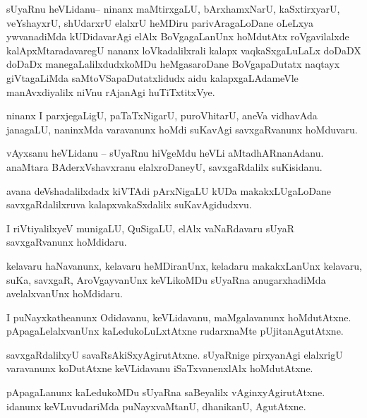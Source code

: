 \documentclass{article}
\begin{document}
\begin{mng}%
sUyaRnu heVLidanu-- ninanx maMtirxgaLU, bArxhamxNarU, kaSxtirxyarU, veYshayxrU, shUdarxrU elalxrU 
heMDiru parivAragaLoDane oLeLxya ywvanadiMda kUDidavarAgi elAlx BoVgagaLanUnx hoMdutAtx 
roVgavilalxde kalApxMtaradavaregU nananx loVkadalilxrali kalapx vaqkaSxgaLuLaLx doDaDX doDaDx 
manegaLalilxdudxkoMDu heMgasaroDane BoVgapaDutatx naqtayx giVtagaLiMda saMtoVSapaDutatxlidudx 
aidu kalapxgaLAdameVle manAvxdiyalilx niVnu rAjanAgi huTiTxtitxVye.
\end{mng}

\begin{mng}%
ninanx I parxjegaLigU, paTaTxNigarU, puroVhitarU, aneVa vidhavAda janagaLU, naninxMda varavanunx 
hoMdi suKavAgi savxgaRvanunx hoMduvaru.
\end{mng}

\begin{mng}%
vAyxsanu heVLidanu -- sUyaRnu hiVgeMdu heVLi aMtadhARnanAdanu. anaMtara BAderxVshavxranu 
elalxroDaneyU, savxgaRdalilx suKisidanu.
\end{mng}

\begin{mng}%
avana deVshadalilxdadx kiVTAdi pArxNigaLU kUDa makakxLUgaLoDane savxgaRdalilxruva 
kalapxvakaSxdalilx suKavAgidudxvu.
\end{mng}

\begin{mng}%
I riVtiyalilxyeV munigaLU, QuSigaLU, elAlx vaNaRdavaru sUyaR savxgaRvanunx hoMdidaru.
\end{mng}

\begin{mng}%
kelavaru haNavanunx, kelavaru heMDiranUnx, keladaru makakxLanUnx kelavaru, suKa, savxgaR, 
AroVgayvanUnx keVLikoMDu sUyaRna anugarxhadiMda avelalxvanUnx hoMdidaru.
\end{mng}

\begin{mng}%
I puNayxkatheanunx Odidavanu, keVLidavanu, maMgalavanunx hoMdutAtxne. pApagaLelalxvanUnx 
kaLedukoLuLxtAtxne rudarxnaMte pUjitanAgutAtxne.
\end{mng}

\begin{mng}%
savxgaRdalilxyU savaRsAkiSxyAgirutAtxne. sUyaRnige pirxyanAgi elalxrigU varavanunx koDutAtxne 
keVLidavanu iSaTxvanenxlAlx hoMdutAtxne.
\end{mng}

\begin{mng}%
pApagaLanunx kaLedukoMDu sUyaRna saBeyalilx vAginxyAgirutAtxne. idanunx keVLuvudariMda 
puNayxvaMtanU, dhanikanU, AgutAtxne.
\end{mng}
\end{document}
